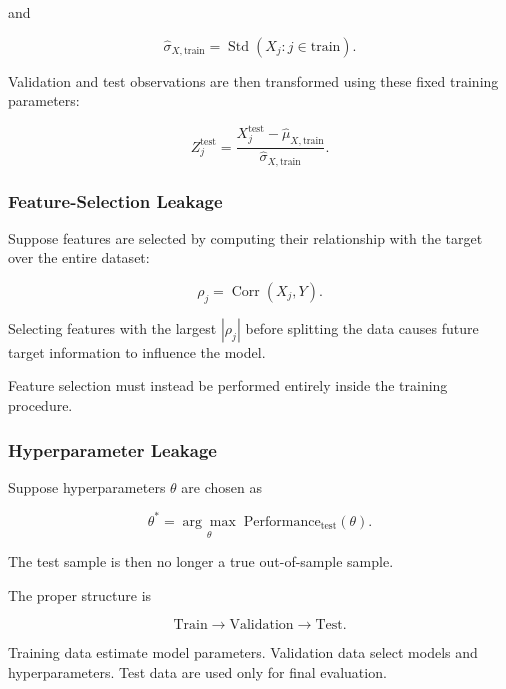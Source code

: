 \documentclass[11pt,a4paper]{article}
\begin{document}
and

\begin{equation}
\widehat{\sigma}_{X,\mathrm{train}}
=
\operatorname{Std}
\left(
X_j:
j\in\mathrm{train}
\right).
\end{equation}

Validation and test observations are then transformed using these fixed
training parameters:

\begin{equation}
Z_j^{\mathrm{test}}
=
\frac{
X_j^{\mathrm{test}}
-
\widehat{\mu}_{X,\mathrm{train}}
}{
\widehat{\sigma}_{X,\mathrm{train}}
}.
\end{equation}


\subsubsection{Feature-Selection Leakage}

Suppose features are selected by computing their relationship with the target
over the entire dataset:

\begin{equation}
\rho_j
=
\operatorname{Corr}
\left(
X_j,
Y
\right).
\end{equation}

Selecting features with the largest $|\rho_j|$ before splitting the data causes
future target information to influence the model.

Feature selection must instead be performed entirely inside the training
procedure.


\subsubsection{Hyperparameter Leakage}

Suppose hyperparameters $\theta$ are chosen as

\begin{equation}
\theta^*
=
\underset{\theta}{\arg\max}
\;
\mathrm{Performance}_{\mathrm{test}}(\theta).
\end{equation}

The test sample is then no longer a true out-of-sample sample.

The proper structure is

\begin{equation}
\boxed{
\text{Train}
\rightarrow
\text{Validation}
\rightarrow
\text{Test}.
}
\end{equation}

Training data estimate model parameters. Validation data select models and
hyperparameters. Test data are used only for final evaluation.
\end{document}
